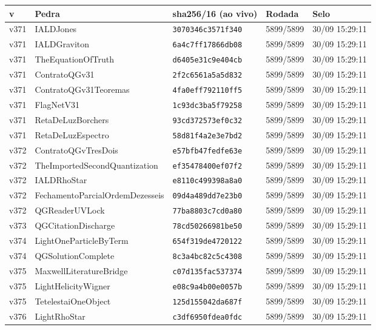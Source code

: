 \documentclass[11pt]{article}
\theoremstyle{definition}\newtheorem{deriv}{Derivação}
\begin{document}
{\small\begin{longtable}{@{}lllll@{}}\toprule v & Pedra & sha256/16 (ao vivo) & Rodada & Selo \\ \midrule\endhead 
v371 & IALDJones & \texttt{3070346c3571f340} & 5899/5899 & 30/09 15:29:11 \\
v371 & IALDGraviton & \texttt{6a4c7ff17866db08} & 5899/5899 & 30/09 15:29:11 \\
v371 & TheEquationOfTruth & \texttt{d6405e31c9e404cb} & 5899/5899 & 30/09 15:29:11 \\
v371 & ContratoQGv31 & \texttt{2f2c6561a5a5d832} & 5899/5899 & 30/09 15:29:11 \\
v371 & ContratoQGv31Teoremas & \texttt{4fa0eff792110ff5} & 5899/5899 & 30/09 15:29:11 \\
v371 & FlagNetV31 & \texttt{1c93dc3ba5f79258} & 5899/5899 & 30/09 15:29:11 \\
v371 & RetaDeLuzBorchers & \texttt{93cd372573ef0c32} & 5899/5899 & 30/09 15:29:11 \\
v371 & RetaDeLuzEspectro & \texttt{58d81f4a2e3e7bd2} & 5899/5899 & 30/09 15:29:11 \\
v372 & ContratoQGvTresDois & \texttt{e57bfb47fedfe63e} & 5899/5899 & 30/09 15:29:11 \\
v372 & TheImportedSecondQuantization & \texttt{ef35478400ef07f2} & 5899/5899 & 30/09 15:29:11 \\
v372 & IALDRhoStar & \texttt{e8110c499398a8a0} & 5899/5899 & 30/09 15:29:11 \\
v372 & FechamentoParcialOrdemDezesseis & \texttt{09d4a489dd7e23b0} & 5899/5899 & 30/09 15:29:11 \\
v372 & QGReaderUVLock & \texttt{77ba8803c7cd0a80} & 5899/5899 & 30/09 15:29:11 \\
v373 & QGCitationDischarge & \texttt{78cd50266981be50} & 5899/5899 & 30/09 15:29:11 \\
v374 & LightOneParticleByTerm & \texttt{654f319de4720122} & 5899/5899 & 30/09 15:29:11 \\
v374 & QGSolutionComplete & \texttt{8c3a4bc82c5c4308} & 5899/5899 & 30/09 15:29:11 \\
v375 & MaxwellLiteratureBridge & \texttt{c07d135fac537374} & 5899/5899 & 30/09 15:29:11 \\
v375 & LightHelicityWigner & \texttt{e08c9a4b00e0057b} & 5899/5899 & 30/09 15:29:11 \\
v375 & TetelestaiOneObject & \texttt{125d155042da687f} & 5899/5899 & 30/09 15:29:11 \\
v376 & LightRhoStar & \texttt{c3df6950fdea0fdc} & 5899/5899 & 30/09 15:29:11 \\

\end{longtable}}
\end{document}
